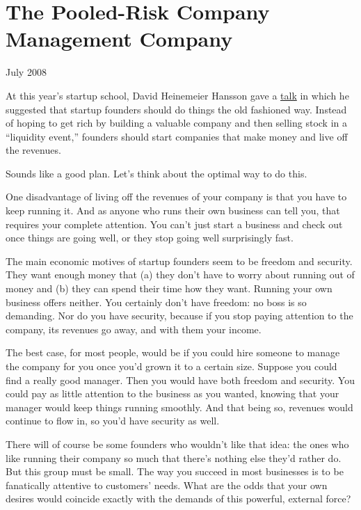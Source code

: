 \documentclass[12pt]{book}
\begin{document}
\chapter{The Pooled-Risk Company Management Company}

July 2008

At this year's startup school, David Heinemeier Hansson gave a
\href{http://www.omnisio.com/startupschool08/david-heinemeier-hansson-at-startup-school-08}{talk}
in which he suggested that startup founders should do things the old
fashioned way. Instead of hoping to get rich by building a valuable
company and then selling stock in a ``liquidity event,'' founders should
start companies that make money and live off the revenues.

Sounds like a good plan. Let's think about the optimal way to do this.

One disadvantage of living off the revenues of your company is that you
have to keep running it. And as anyone who runs their own business can
tell you, that requires your complete attention. You can't just start a
business and check out once things are going well, or they stop going
well surprisingly fast.

The main economic motives of startup founders seem to be freedom and
security. They want enough money that (a) they don't have to worry about
running out of money and (b) they can spend their time how they want.
Running your own business offers neither. You certainly don't have
freedom: no boss is so demanding. Nor do you have security, because if
you stop paying attention to the company, its revenues go away, and with
them your income.

The best case, for most people, would be if you could hire someone to
manage the company for you once you'd grown it to a certain size.
Suppose you could find a really good manager. Then you would have both
freedom and security. You could pay as little attention to the business
as you wanted, knowing that your manager would keep things running
smoothly. And that being so, revenues would continue to flow in, so
you'd have security as well.

There will of course be some founders who wouldn't like that idea: the
ones who like running their company so much that there's nothing else
they'd rather do. But this group must be small. The way you succeed in
most businesses is to be fanatically attentive to customers' needs. What
are the odds that your own desires would coincide exactly with the
demands of this powerful, external force?
\end{document}
